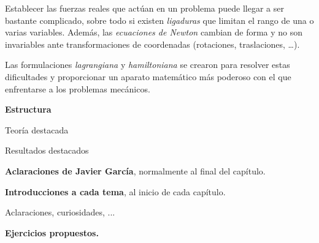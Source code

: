 Establecer las fuerzas reales que actúan en un problema puede llegar a ser bastante complicado, sobre todo si existen \emph{ligaduras} que limitan el rango de una o varias variables. Además, las \emph{ecuaciones de Newton} cambian de forma y no son invariables ante transformaciones de coordenadas (rotaciones, traslaciones, …).

Las formulaciones \emph{lagrangiana} y \emph{hamiltoniana} se crearon para resolver estas dificultades y proporcionar un aparato matemático más poderoso con el que enfrentarse a los problemas mecánicos.

\vspace{1cm}

\textbf{Estructura}

\begin{adjustwidth}{20pt}{20pt}
	\vspace{5mm} \begin{myblock}{Teoría destacada}
		
	\end{myblock}
	
	\vspace{5mm} \begin{myalertblock}{Resultados destacados}
		
	\end{myalertblock}
	
	\vspace{5mm} \begin{ejemplo} 
		\textbf{Aclaraciones de Javier García}, normalmente al final del capítulo.
		
		\textbf{Introducciones a cada tema}, al inicio de cada capítulo.
	\end{ejemplo}
	
	
	\vspace{5mm} \begin{myexampleblock}{Aclaraciones, curiosidades, ...}
		
	\end{myexampleblock}
	
		\vspace{5mm} \begin{ejercicio} \textbf{Ejercicios propuestos.} \end{ejercicio}

\end{adjustwidth}





\vspace{1cm}

